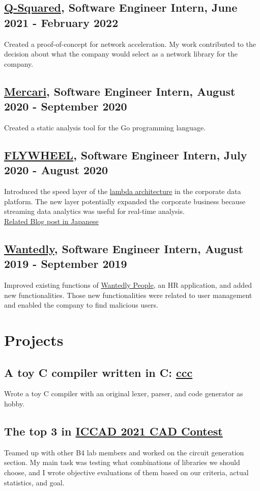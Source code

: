 \documentclass[10pt]{article}
\begin{document}
  \subsection*{\href{https://q-squared.jp}{Q-Squared}, Software Engineer Intern, June 2021 - February 2022}
    Created a proof-of-concept for network acceleration.
    My work contributed to the decision about what the company would select as a network library for the company.
  \subsection*{\href{https://about.mercari.com/en}{Mercari}, Software Engineer Intern, August 2020 - September 2020}
    Created a static analysis tool for the Go programming language.
  \subsection*{\href{https://www.flywheel.jp}{FLYWHEEL}, Software Engineer Intern, July 2020 - August 2020}
    Introduced the speed layer of the \href{https://www.databricks.com/glossary/lambda-architecture}{lambda architecture} in the corporate data platform.
    The new layer potentially expanded the corporate business because streaming data analytics was useful for real-time analysis.
    \\
    \href{https://www.flywheel.jp/topics/20200917}{Related Blog post in Japanese}
  \subsection*{\href{https://wantedlyinc.com/ja}{Wantedly}, Software Engineer Intern, August 2019 - September 2019}
    Improved existing functions of \href{https://people.wantedly.com/}{Wantedly People}, an HR application, and added new functionalities.
    Those new functionalities were related to user management and enabled the company to find malicious users.

\section*{Projects}
  \subsection*{A toy C compiler written in C: \href{https://github.com/diohabara/ccc}{ccc}}
    Wrote a toy C compiler with an original lexer, parser, and code generator as hobby.
  \subsection*{The top 3 in \href{http://iccad-contest.org/2021/}{ICCAD 2021 CAD Contest}}
    Teamed up with other B4 lab members and worked on the circuit generation section.
    My main task was testing what combinations of libraries we should choose, and I wrote objective evaluations of them based on our criteria, actual statistics, and goal.
\end{document}
